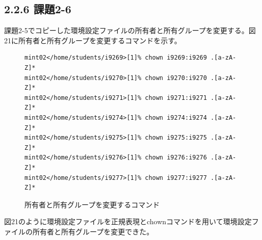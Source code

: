 \documentclass[12pt]{jreport}
\begin{document}
            \subsection*{2.2.6 課題2-6}
                課題2-5でコピーした環境設定ファイルの所有者と所有グループを変更する。図21に所有者と所有グループを変更するコマンドを示す。
                \begin{figure}[H]
                    \begin{center}
                        \begin{screen}
                            \begin{verbatim}
mint02</home/students/i9269>[1]% chown i9269:i9269 .[a-zA-Z]*
mint02</home/students/i9270>[1]% chown i9270:i9270 .[a-zA-Z]*
mint02</home/students/i9271>[1]% chown i9271:i9271 .[a-zA-Z]*
mint02</home/students/i9274>[1]% chown i9274:i9274 .[a-zA-Z]*
mint02</home/students/i9275>[1]% chown i9275:i9275 .[a-zA-Z]*
mint02</home/students/i9276>[1]% chown i9276:i9276 .[a-zA-Z]*
mint02</home/students/i9277>[1]% chown i9277:i9277 .[a-zA-Z]*
                            \end{verbatim}
                        \end{screen}
                        \caption{所有者と所有グループを変更するコマンド}
                        \label{21}
                    \end{center}
                \end{figure}
                図21のように環境設定ファイルを正規表現とchownコマンドを用いて環境設定ファイルの所有者と所有グループを変更できた。
\end{document}
